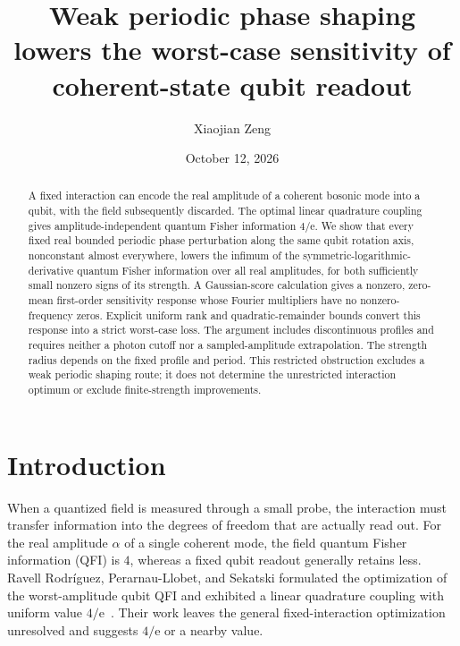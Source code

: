 \documentclass[aps,pra,reprint,amsmath,amssymb,nofootinbib,floatfix]{revtex4-2}
\newcommand{\ee}{\mathrm{e}}
\begin{document}
\title{Weak periodic phase shaping lowers the worst-case sensitivity of coherent-state qubit readout}
\author{Xiaojian Zeng}
\date{October 12, 2026}

\begin{abstract}
A fixed interaction can encode the real amplitude of a coherent bosonic
mode into a qubit, with the field subsequently discarded. The optimal
linear quadrature coupling gives amplitude-independent quantum Fisher
information $4/\ee$. We show that every fixed real bounded periodic phase
perturbation along the same qubit rotation axis, nonconstant almost
everywhere, lowers the infimum of the symmetric-logarithmic-derivative
quantum Fisher information over all real amplitudes, for both sufficiently
small nonzero signs of its strength. A Gaussian-score calculation gives a
nonzero, zero-mean first-order sensitivity response whose Fourier
multipliers have no nonzero-frequency zeros. Explicit uniform rank and
quadratic-remainder bounds convert this response into a strict worst-case
loss. The argument includes discontinuous profiles and requires neither a
photon cutoff nor a sampled-amplitude extrapolation. The strength radius
depends on the fixed profile and period. This restricted obstruction
excludes a weak periodic shaping route; it does not determine the
unrestricted interaction optimum or exclude finite-strength improvements.
\end{abstract}
\maketitle

\section{Introduction}

When a quantized field is measured through a small probe, the interaction
must transfer information into the degrees of freedom that are actually
read out. For the real amplitude $\alpha$ of a single coherent mode, the
field quantum Fisher information (QFI) is $4$, whereas a fixed qubit
readout generally retains less. Ravell Rodr\'{i}guez, Perarnau-Llobet, and
Sekatski formulated the optimization of the worst-amplitude qubit QFI and
exhibited a linear quadrature coupling with uniform value
$4/\ee$~\cite{ravell2026}. Their work leaves the general fixed-interaction
optimization unresolved and suggests $4/\ee$ or a nearby value.
\end{document}

